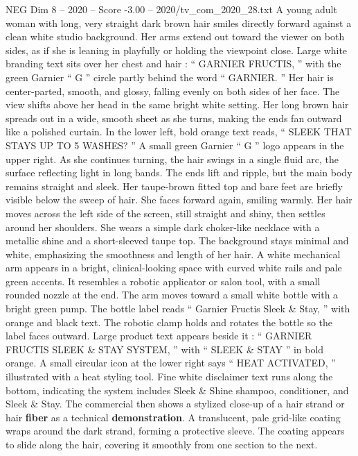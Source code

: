 \begin{textsample}{NEG Dim 8 – 2020 – Score -3.00 – 2020/tv\_com\_2020\_28.txt}  \label{ex:f8_neg_047}
A young adult woman with long, very straight dark brown hair smiles directly forward against a clean white studio background.
Her arms extend out toward the viewer on both sides, as if she is leaning in playfully or holding the viewpoint close.
Large white branding text sits over her chest and hair : “ GARNIER FRUCTIS, ” with the green Garnier “ G ” circle partly behind the word “ GARNIER. ” Her hair is center-parted, smooth, and glossy, falling evenly on both sides of her face.
The view shifts above her head in the same bright white setting.
Her long brown hair spreads out in a wide, smooth sheet as she turns, making the ends fan outward like a polished curtain.
In the lower left, bold orange text reads, “ SLEEK THAT STAYS UP TO 5 WASHES? ” A small green Garnier “ G ” logo appears in the upper right.
As she continues turning, the hair swings in a single fluid arc, the surface reflecting light in long bands.
The ends lift and ripple, but the main body remains straight and sleek.
Her taupe-brown fitted top and bare feet are briefly visible below the sweep of hair.
She faces forward again, smiling warmly.
Her hair moves across the left side of the screen, still straight and shiny, then settles around her shoulders.
She wears a simple dark choker-like necklace with a metallic shine and a short-sleeved taupe top.
The background stays minimal and white, emphasizing the smoothness and length of her hair.
A white mechanical arm appears in a bright, clinical-looking space with curved white rails and pale green accents.
It resembles a robotic applicator or salon tool, with a small rounded nozzle at the end.
The arm moves toward a small white bottle with a bright green pump.
The bottle label reads “ Garnier Fructis Sleek \& Stay, ” with orange and black text.
The robotic clamp holds and rotates the bottle so the label faces outward.
Large product text appears beside it : “ GARNIER FRUCTIS SLEEK \& STAY SYSTEM, ” with “ SLEEK \& STAY ” in bold orange.
A small circular icon at the lower right says “ HEAT ACTIVATED, ” illustrated with a heat styling tool.
Fine white disclaimer text runs along the bottom, indicating the system includes Sleek \& Shine shampoo, conditioner, and Sleek \& Stay.
The commercial then shows a stylized close-up of a hair strand or hair \textbf{fiber} as a technical \textbf{demonstration}.
A translucent, pale grid-like coating wraps around the dark strand, forming a protective sleeve.
The coating appears to slide along the hair, covering it smoothly from one section to the next.

\end{textsample}
